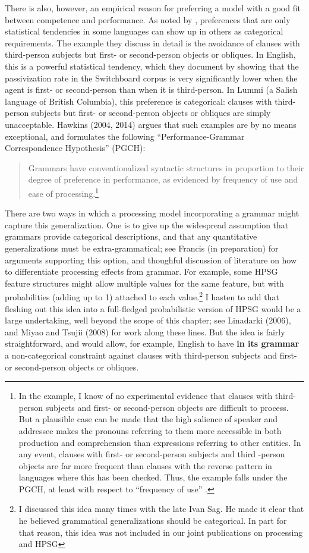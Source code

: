 \documentclass[a4paper]{article}
\begin{document}
There is also, however, an empirical reason for preferring a model with a good fit between competence and performance.  As noted by \citet{BresnanEtAl2001}, preferences that are only statistical tendencies in some languages can show up in others as categorical requirements.  The example they discuss in detail is the avoidance of clauses with third-person subjects but first- or second-person objects or obliques. In English, this is a powerful statistical tendency, which they document by showing that the passivization rate in the Switchboard corpus is very significantly lower when the agent is first- or second-person than when it is third-person.  In Lummi (a Salish language of British Columbia), this preference is categorical:  clauses with third-person subjects but first- or second-person objects or obliques are simply unacceptable.  Hawkins (2004, 2014) argues that such examples are by no means exceptional, and formulates the following ``Performance-Grammar Correspondence Hypothesis'' (PGCH):
\begin{quote}
Grammars  have  conventionalized  syntactic  structures  in  proportion   to their degree of preference in performance, as evidenced by frequency of use and ease of processing.\footnote {In the \citeauthor{BresnanEtAl2001} example, I know of no experimental evidence that clauses with third-person subjects and first- or second-person objects are difficult to process.  But a plausible case can be made that the high salience of speaker and addressee makes the pronouns referring to them more accessible in both production and comprehension than expressions referring to other entities.  In any event, clauses with first- or second-person subjects and third -person objects are far more frequent than clauses with the reverse pattern in languages where this has been checked.  Thus, the \citeauthor{BresnanEtAl2001} example falls under the PGCH, at least with respect to ``frequency of use'' .}
\end{quote}
There are two ways in which a processing model incorporating a grammar might capture this generalization.  One is to give up the widespread assumption that grammars provide categorical descriptions, and that any quantitative generalizations must be extra-grammatical; see Francis (in preparation) for arguments supporting this option, and thoughful discussion of literature on how to differentiate processing effects from grammar.  For example, some HPSG feature structures might allow multiple values for the same feature, but with probabilities (adding up to 1) attached to each value.\footnote{I discussed this idea many times with the late Ivan Sag.  He made it clear that he believed grammatical generalizations should be categorical.  In part for that reason, this idea was not included in our joint publications on processing and HPSG}  I hasten to add that fleshing out this idea into a full-fledged probabilistic version of HPSG would be a large undertaking, well beyond the scope of this chapter; see Linadarki (2006), and Miyao and Tsujii (2008) for work along these lines.  But the idea is fairly straightforward, and would allow, for example, English to have {\bf in its grammar} a non-categorical constraint against clauses with third-person subjects and first- or second-person objects or obliques.  
\end{document}
